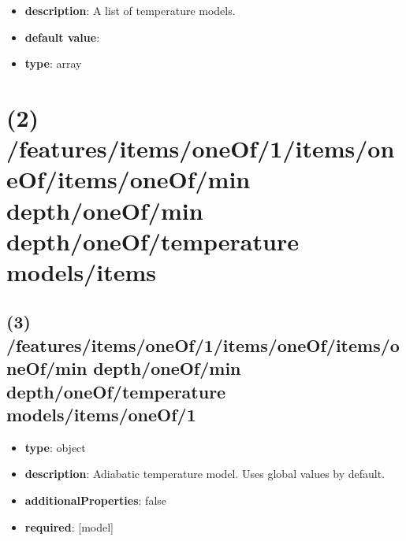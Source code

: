 \begin{itemize}[leftmargin=1em]\item {\bf description}: A list of temperature models.
\item {\bf default value}: 
\item {\bf type}: array
\end{itemize}\section{(2) /features/items/oneOf/1/items/oneOf/items/oneOf/min depth/oneOf/min depth/oneOf/temperature models/items}

\subsection{(3) /features/items/oneOf/1/items/oneOf/items/oneOf/min depth/oneOf/min depth/oneOf/temperature models/items/oneOf/1}
\begin{itemize}[leftmargin=3em]\item {\bf type}: object
\item {\bf description}: Adiabatic temperature model. Uses global values by default.
\item {\bf additionalProperties}: false
\item {\bf required}: [model]\end{itemize}
